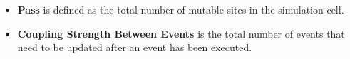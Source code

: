 \documentclass[a4paper,fleqn]{cas-dc}
\def\wx#1{\textcolor[rgb]{1,0,1}{{\sffamily WX:  #1}}}
\begin{document}
\begin{itemize}
    \item \textbf{Pass} is defined as the total number of mutable sites in the simulation cell.
    
    \item \textbf{Coupling Strength Between Events} is the total number of events that need to be updated after an event has been executed.
\end{itemize}









\end{document}

